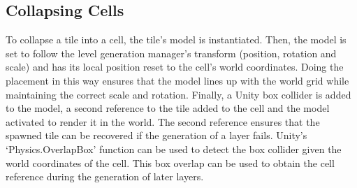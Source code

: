 
\subsection{Collapsing Cells}\label{sec:collapsingCells}
To collapse a tile into a cell, the tile's model is instantiated. Then, the model is set to follow the level generation manager's transform (position, rotation and scale) and has its local position reset to the cell's world coordinates. Doing the placement in this way ensures that the model lines up with the world grid while maintaining the correct scale and rotation. Finally, a Unity box collider is added to the model, a second reference to the tile added to the cell and the model activated to render it in the world. The second reference ensures that the spawned tile can be recovered if the generation of a layer fails. Unity's `Physics.OverlapBox' function can be used to detect the box collider given the world coordinates of the cell. This box overlap can be used to obtain the cell reference during the generation of later layers.

